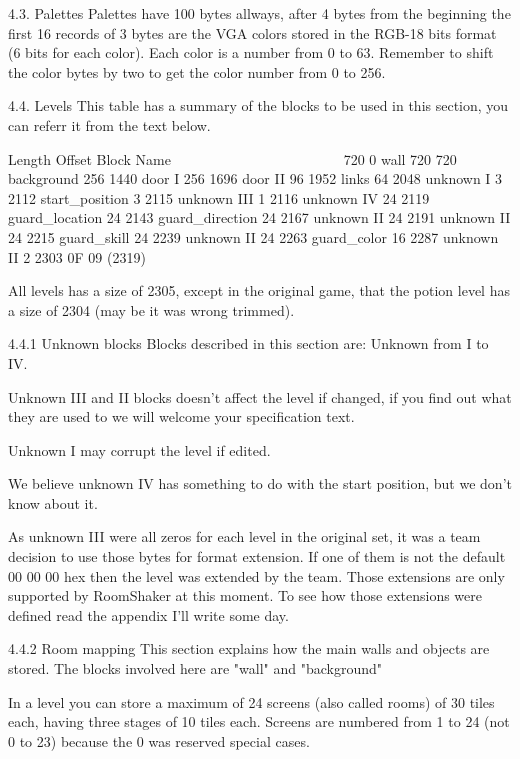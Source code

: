 4.3. Palettes
 Palettes have 100 bytes allways, after 4 bytes from the beginning the
 first 16 records of 3 bytes are the VGA colors stored in the RGB-18 bits
 format (6 bits for each color). Each color is a number from 0 to 63.
 Remember to shift the color bytes by two to get the color number from 0
 to 256.
 
4.4. Levels
 This table has a summary of the blocks to be used in this section,
 you can referr it from the text below.

 Length Offset  Block Name
 ~~~~~~ ~~~~~~  ~~~~~~~~~~
 720    0       wall
 720    720     background
 256    1440    door I
 256    1696    door II
 96     1952    links
 64     2048    unknown I
 3      2112    start_position
 3      2115    unknown III
 1      2116    unknown IV
 24     2119    guard_location
 24     2143    guard_direction
 24     2167    unknown II
 24     2191    unknown II
 24     2215    guard_skill
 24     2239    unknown II
 24     2263    guard_color
 16     2287    unknown II
 2      2303    0F 09 (2319)

 All levels has a size of 2305, except in the original game, that the
 potion level has a size of 2304 (may be it was wrong trimmed).

4.4.1 Unknown blocks
 Blocks described in this section are: Unknown from I to IV.

 Unknown III and II blocks doesn't affect the level if changed, if you find
 out what they are used to we will welcome your specification text.

 Unknown I may corrupt the level if edited.

 We believe unknown IV has something to do with the start position, but we
 don't know about it.

 As unknown III were all zeros for each level in the original set, it was a
 team decision to use those bytes for format extension. If one of them is
 not the default 00 00 00 hex then the level was extended by the team.
 Those extensions are only supported by RoomShaker at this  moment. To see
 how those extensions were defined read the appendix I'll write some day.
 
4.4.2 Room mapping
 This section explains how the main walls and objects are stored. The
 blocks involved here are "wall" and "background"

 In a level you can store a maximum of 24 screens (also called rooms) of 30
 tiles each, having three stages of 10 tiles each. Screens are numbered
 from 1 to 24 (not 0 to 23) because the 0 was reserved special cases.

